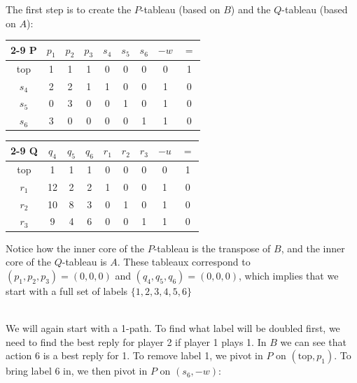 \documentclass[12pt]{article}
\begin{document}
\noindent
The first step is to create the $P$-tableau (based on $B$) and the $Q$-tableau (based on $A$):

\begin{table}[h]
    \begin{minipage}{.5\linewidth}
        \centering
        \begin{tabular}{c|ccc|ccc|c|c|}
            \cline{2-9}
            \textbf{P} & $p_1$ & $p_2$ & $p_3$ & $s_4$ & $s_5$ & $s_6$ & $-w$ & $=$ \\ \hline
            \multicolumn{1}{|c|}{top} & 1 & 1 & 1 & 0 & 0 & 0 & 0 & 1 \\ \hline
            \multicolumn{1}{|c|}{$s_4$} & 2 & 2 & 1 & 1 & 0 & 0 & 1 & 0 \\
            \multicolumn{1}{|c|}{$s_5$} & 0 & 3 & 0 & 0 & 1 & 0 & 1 & 0 \\
            \multicolumn{1}{|c|}{$s_6$} & 3 & 0 & 0 & 0 & 0 & 1 & 1 & 0 \\ \hline
        \end{tabular}
    \end{minipage}%
    \begin{minipage}{.5\linewidth}
        \centering
        \begin{tabular}{c|ccc|ccc|c|c|}
            \cline{2-9}
            \textbf{Q} & $q_4$ & $q_5$ & $q_6$ & $r_1$ & $r_2$ & $r_3$ & $-u$ & $=$ \\ \hline
            \multicolumn{1}{|c|}{top} & 1 & 1 & 1 & 0 & 0 & 0 & 0 & 1 \\ \hline
            \multicolumn{1}{|c|}{$r_1$} & 12 & 2 & 2 & 1 & 0 & 0 & 1 & 0 \\
            \multicolumn{1}{|c|}{$r_2$} & 10 & 8 & 3 & 0 & 1 & 0 & 1 & 0 \\
            \multicolumn{1}{|c|}{$r_3$} & 9 & 4 & 6 & 0 & 0 & 1 & 1 & 0 \\ \hline
        \end{tabular}
    \end{minipage}
\end{table}

\noindent
Notice how the inner core of the $P$-tableau is the transpose of $B$, and the inner core of the $Q$-tableau is $A$.
These tableaux correspond to $(p_1, p_2, p_3) = (0, 0, 0)$ and $(q_4, q_5, q_6) = (0, 0, 0)$, which implies that we start with a full set of labels $\{ 1, 2, 3, 4, 5, 6 \}$

\noindent
\\
We will again start with a 1-path.
To find what label will be doubled first, we need to find the best reply for player 2 if player 1 plays 1.
In $B$ we can see that action 6 is a best reply for 1.
To remove label 1, we pivot in $P$ on $(\text{top}, p_1)$.
To bring label 6 in, we then pivot in $P$ on $(s_6, -w)$:
\end{document}
